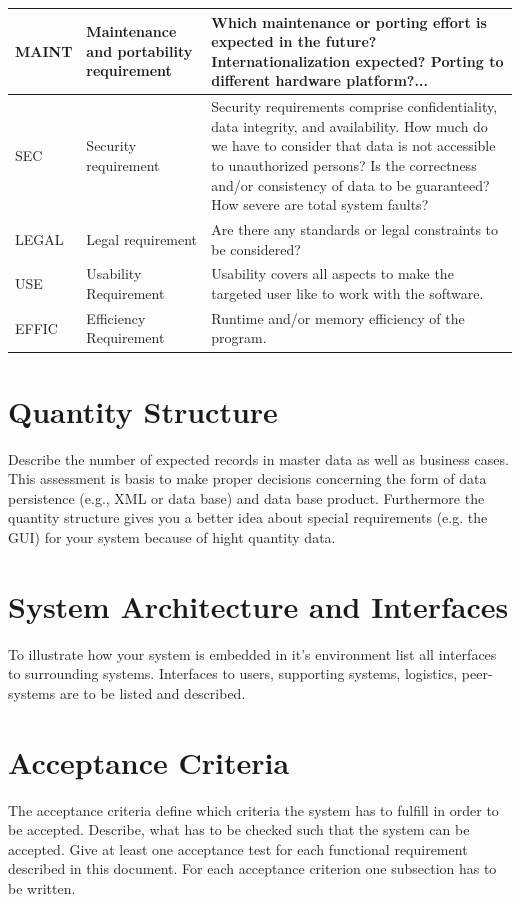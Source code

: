 \documentclass[12pt]{article}
\theoremstyle{definition}
\newenvironment{explanation}{%
   \setlength{\parindent}{0pt}
   \itshape
   \color{blue}
}{}
\begin{document}
\begin{tabular}{|p{.15\linewidth}|p{.25\linewidth}|p{.4\linewidth}|}
\hline
MAINT & Maintenance and portability requirement & Which maintenance or porting effort is expected in the future? Internationalization expected? Porting to different hardware platform?... \\ \hline
SEC & Security requirement & Security requirements comprise confidentiality, data integrity, and availability. How much do we have to consider that data is not accessible to unauthorized persons? Is the correctness and/or consistency of data to be guaranteed? How severe are total system faults? \\ \hline
LEGAL & Legal requirement & Are there any standards or legal constraints to be considered? \\ \hline
USE & Usability Requirement & Usability covers all aspects to make the targeted user like to work with the software. \\ \hline
EFFIC & Efficiency Requirement & Runtime and/or memory efficiency of the program. \\ \hline
\end{tabular}
\pagebreak

\section{Quantity Structure}
\begin{explanation}
Describe the number of expected records in master data as well as business cases. This assessment is basis to make proper decisions concerning the form of data persistence (e.g., XML or data base) and data base product. Furthermore the quantity structure gives you a better idea about special requirements (e.g. the GUI) for your system because of hight quantity data.
\end{explanation}

\pagebreak
\section{System Architecture and Interfaces}
\begin{explanation}
To illustrate how your system is embedded in it’s environment list all interfaces to surrounding systems. Interfaces to users, supporting systems, logistics, peer-systems are to be listed and described.
\end{explanation}

\pagebreak
\section{Acceptance Criteria}
\begin{explanation}
The acceptance criteria define which criteria the system has to fulfill in order to be accepted. Describe, what has to be checked such that the system can be accepted. Give at least one acceptance test for each functional requirement described in this document. For each acceptance criterion one subsection has to be written.
\end{explanation}
\end{document}

